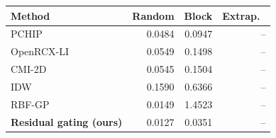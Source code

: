 \small
\begin{tabular}{lrrr}\toprule
Method & Random & Block & Extrap.\ \\\midrule
PCHIP & 0.0484 & 0.0947 & -- \\
OpenRCX-LI & 0.0549 & 0.1498 & -- \\
CMI-2D & 0.0545 & 0.1504 & -- \\
IDW & 0.1590 & 0.6366 & -- \\
RBF-GP & 0.0149 & 1.4523 & -- \\
\textbf{Residual gating (ours)} & 0.0127 & 0.0351 & -- \\
\bottomrule\end{tabular}
